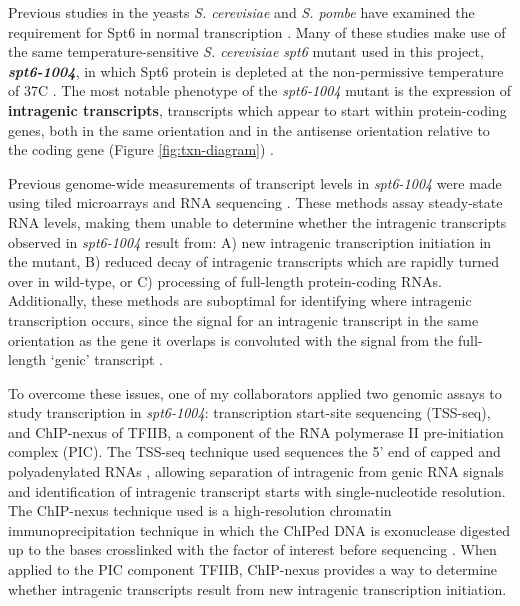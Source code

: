 \documentclass[9pt, letterpaper]{article}
\begin{document}
Previous studies in the yeasts \textit{S. cerevisiae} and \textit{S. pombe} have examined the requirement for Spt6 in normal transcription \cite{cheung2008, degennaro2013, kaplan2003, pathak2018, uwimana2017, vanbakel2013}. Many of these studies make use of the same temperature-sensitive \textit{S. cerevisiae} \textit{spt6} mutant used in this project, \textbf{\textit{spt6-1004}}, in which Spt6 protein is depleted at the non-permissive temperature of 37\textdegree C \cite{kaplan2003}. The most notable phenotype of the \textit{spt6-1004} mutant is the expression of \textbf{intragenic transcripts}, transcripts which appear to start within protein-coding genes, both in the same orientation and in the antisense orientation relative to the coding gene (Figure \ref{fig:txn-diagram}) \cite{cheung2008, degennaro2013, kaplan2003, uwimana2017}.

Previous genome-wide measurements of transcript levels in \textit{spt6-1004} were made using tiled microarrays \cite{cheung2008} and RNA sequencing \cite{uwimana2017}. These methods assay steady-state RNA levels, making them unable to determine whether the intragenic transcripts observed in \textit{spt6-1004} result from: A) new intragenic transcription initiation in the mutant, B) reduced decay of intragenic transcripts which are rapidly turned over in wild-type, or C) processing of full-length protein-coding RNAs. Additionally, these methods are suboptimal for identifying where intragenic transcription occurs, since the signal for an intragenic transcript in the same orientation as the gene it overlaps is convoluted with the signal from the full-length `genic' transcript \cite{cheung2008, lickwar2009}.

To overcome these issues, one of my collaborators applied two genomic assays to study transcription in \textit{spt6-1004}: transcription start-site sequencing (TSS-seq), and ChIP-nexus of TFIIB, a component of the RNA polymerase II pre-initiation complex (PIC). The TSS-seq technique used sequences the 5' end of capped and polyadenylated RNAs \cite{arribere2013, malabat2015}, allowing separation of intragenic from genic RNA signals and identification of intragenic transcript starts with single-nucleotide resolution. The ChIP-nexus technique used is a high-resolution chromatin immunoprecipitation technique in which the ChIPed DNA is exonuclease digested up to the bases crosslinked with the factor of interest before sequencing \cite{he2015}. When applied to the PIC component TFIIB, ChIP-nexus provides a way to determine whether intragenic transcripts result from new intragenic transcription initiation.
\end{document}
